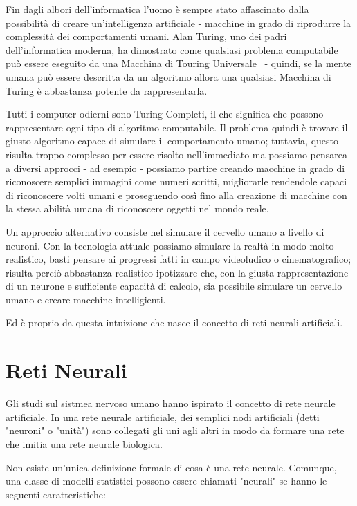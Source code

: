 Fin dagli albori dell'informatica l'uomo \`e sempre stato affascinato dalla possibilit\`a di creare un'intelligenza artificiale - macchine in grado di riprodurre la complessit\`a dei comportamenti umani.
Alan Turing, uno dei padri dell'informatica moderna, ha dimostrato come qualsiasi problema computabile pu\`o essere eseguito da una Macchina di Touring Universale~\cite{wiki:MacchinaTuring} - quindi, se la mente umana pu\`o essere descritta da un algoritmo allora una qualsiasi Macchina di Turing \`e abbastanza potente da rappresentarla.

Tutti i computer odierni sono Turing Completi, il che significa che possono rappresentare ogni tipo di algoritmo computabile.
Il problema quindi \`e trovare il giusto algoritmo capace di simulare il comportamento umano; tuttavia, questo risulta troppo complesso per essere risolto nell'immediato ma possiamo pensarea a diversi approcci - ad esempio - possiamo partire creando macchine in grado di riconoscere semplici immagini come numeri scritti, migliorarle rendendole capaci di riconoscere volti umani e proseguendo cos\`i fino alla creazione di macchine con la stessa abilit\`a umana di riconoscere oggetti nel mondo reale.

Un approccio alternativo consiste nel simulare il cervello umano a livello di neuroni.
Con la tecnologia attuale possiamo simulare la realt\`a in modo molto realistico, basti pensare ai progressi fatti in campo videoludico o cinematografico; risulta perci\`o abbastanza realistico ipotizzare che, con la giusta rappresentazione di un neurone e sufficiente capacit\`a di calcolo, sia possibile simulare un cervello umano e creare macchine intelligienti.

Ed \`e proprio da questa intuizione che nasce il concetto di reti neurali artificiali.

\section{Reti Neurali}
Gli studi sul sistmea nervoso umano hanno ispirato il concetto di rete neurale artificiale.
In una rete neurale artificiale, dei semplici nodi artificiali (detti "neuroni" o "unit\`a") sono collegati gli uni agli altri in modo da formare una rete che imitia una rete neurale biologica.

Non esiste un'unica definizione formale di cosa \`e una rete neurale.
Comunque, una classe di modelli statistici possono essere chiamati "neurali" se hanno le seguenti caratteristiche:

